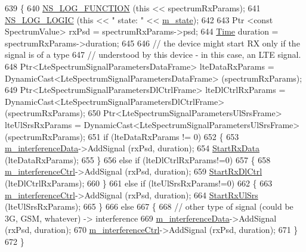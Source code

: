 \begin{DoxyCode}
639 \{
640   \hyperlink{log-macros-disabled_8h_a90b90d5bad1f39cb1b64923ea94c0761}{NS\_LOG\_FUNCTION} (\textcolor{keyword}{this} << spectrumRxParams);
641   \hyperlink{group__logging_ga88acd260151caf2db9c0fc84997f45ce}{NS\_LOG\_LOGIC} (\textcolor{keyword}{this} << \textcolor{stringliteral}{" state: "} << \hyperlink{classns3_1_1LteSpectrumPhy_a985b6688f1bbfcd8703096040b5c9b10}{m\_state});
642   
643   Ptr <const SpectrumValue> rxPsd = spectrumRxParams->psd;
644   \hyperlink{namespacens3_1_1TracedValueCallback_a7ffd3e7c142ffe7c8a1d2db9b8de38ec}{Time} duration = spectrumRxParams->duration;
645   
646   \textcolor{comment}{// the device might start RX only if the signal is of a type}
647   \textcolor{comment}{// understood by this device - in this case, an LTE signal.}
648   Ptr<LteSpectrumSignalParametersDataFrame> lteDataRxParams = 
      DynamicCast<LteSpectrumSignalParametersDataFrame> (spectrumRxParams);
649   Ptr<LteSpectrumSignalParametersDlCtrlFrame> lteDlCtrlRxParams = 
      DynamicCast<LteSpectrumSignalParametersDlCtrlFrame> (spectrumRxParams);
650   Ptr<LteSpectrumSignalParametersUlSrsFrame> lteUlSrsRxParams = 
      DynamicCast<LteSpectrumSignalParametersUlSrsFrame> (spectrumRxParams);
651   \textcolor{keywordflow}{if} (lteDataRxParams != 0)
652     \{
653       \hyperlink{classns3_1_1LteSpectrumPhy_a15a694dda0ac5ef3b0008c3fc2237f35}{m\_interferenceData}->AddSignal (rxPsd, duration);
654       \hyperlink{classns3_1_1LteSpectrumPhy_a496c5216723459c21c02576f8a5056af}{StartRxData} (lteDataRxParams);
655     \}
656   \textcolor{keywordflow}{else} \textcolor{keywordflow}{if} (lteDlCtrlRxParams!=0)
657     \{
658       \hyperlink{classns3_1_1LteSpectrumPhy_ad578c25e0d4dd05b888c4dd83ec52e13}{m\_interferenceCtrl}->AddSignal (rxPsd, duration);
659       \hyperlink{classns3_1_1LteSpectrumPhy_a2ea6de28b21dcae1c26d42aecac47341}{StartRxDlCtrl} (lteDlCtrlRxParams);
660     \}
661   \textcolor{keywordflow}{else} \textcolor{keywordflow}{if} (lteUlSrsRxParams!=0)
662     \{
663       \hyperlink{classns3_1_1LteSpectrumPhy_ad578c25e0d4dd05b888c4dd83ec52e13}{m\_interferenceCtrl}->AddSignal (rxPsd, duration);
664       \hyperlink{classns3_1_1LteSpectrumPhy_a3023664623c55b331bee210d6b3cc5a5}{StartRxUlSrs} (lteUlSrsRxParams);
665     \}
666   \textcolor{keywordflow}{else}
667     \{
668       \textcolor{comment}{// other type of signal (could be 3G, GSM, whatever) -> interference}
669       \hyperlink{classns3_1_1LteSpectrumPhy_a15a694dda0ac5ef3b0008c3fc2237f35}{m\_interferenceData}->AddSignal (rxPsd, duration);
670       \hyperlink{classns3_1_1LteSpectrumPhy_ad578c25e0d4dd05b888c4dd83ec52e13}{m\_interferenceCtrl}->AddSignal (rxPsd, duration);
671     \}    
672 \}
\end{DoxyCode}


